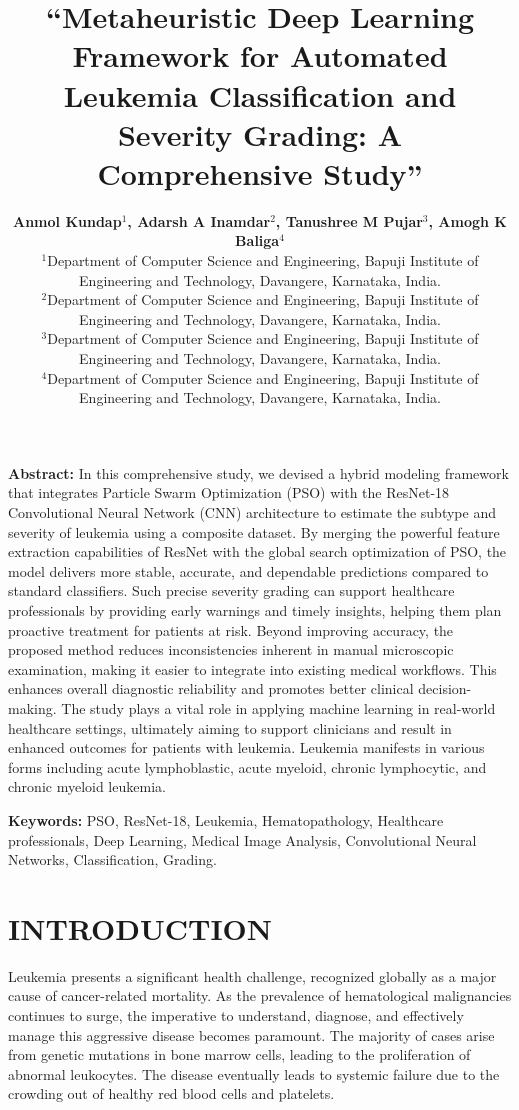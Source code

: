 \documentclass[twocolumn,10pt,a4paper]{article}
\title{\Large \textbf{“Metaheuristic Deep Learning Framework for Automated Leukemia Classification and Severity Grading: A Comprehensive Study”}}
\author{
    \textbf{Anmol Kundap$^1$, Adarsh A Inamdar$^2$, Tanushree M Pujar$^3$, Amogh K Baliga$^4$} \\
    \small $^1$Department of Computer Science and Engineering,  Bapuji Institute of Engineering and Technology, Davangere, Karnataka, India. \\
    \small $^2$Department of Computer Science and Engineering, Bapuji Institute of Engineering and Technology, Davangere, Karnataka, India. \\
    \small $^3$Department of Computer Science and Engineering, Bapuji Institute of Engineering and Technology, Davangere, Karnataka, India. \\
    \small $^4$Department of Computer Science and Engineering, Bapuji Institute of Engineering and Technology, Davangere, Karnataka, India.
}
\date{}
\begin{document}
\maketitle
\thispagestyle{fancy}

\textbf{Abstract:} In this comprehensive study, we devised a hybrid modeling framework that integrates Particle Swarm Optimization (PSO) with the ResNet-18 Convolutional Neural Network (CNN) architecture to estimate the subtype and severity of leukemia using a composite dataset. By merging the powerful feature extraction capabilities of ResNet with the global search optimization of PSO, the model delivers more stable, accurate, and dependable predictions compared to standard classifiers. Such precise severity grading can support healthcare professionals by providing early warnings and timely insights, helping them plan proactive treatment for patients at risk. Beyond improving accuracy, the proposed method reduces inconsistencies inherent in manual microscopic examination, making it easier to integrate into existing medical workflows. This enhances overall diagnostic reliability and promotes better clinical decision-making. The study plays a vital role in applying machine learning in real-world healthcare settings, ultimately aiming to support clinicians and result in enhanced outcomes for patients with leukemia. Leukemia manifests in various forms including acute lymphoblastic, acute myeloid, chronic lymphocytic, and chronic myeloid leukemia.

\textbf{Keywords:} PSO, ResNet-18, Leukemia, Hematopathology, Healthcare professionals, Deep Learning, Medical Image Analysis, Convolutional Neural Networks, Classification, Grading.

\section{INTRODUCTION}
Leukemia presents a significant health challenge, recognized globally as a major cause of cancer-related mortality. As the prevalence of hematological malignancies continues to surge, the imperative to understand, diagnose, and effectively manage this aggressive disease becomes paramount. The majority of cases arise from genetic mutations in bone marrow cells, leading to the proliferation of abnormal leukocytes. The disease eventually leads to systemic failure due to the crowding out of healthy red blood cells and platelets.
\end{document}
